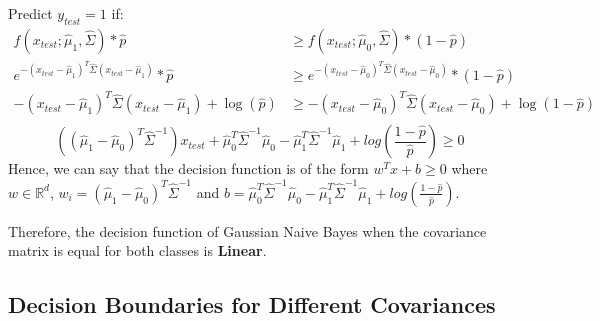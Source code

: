 \documentclass[
]{article}
\begin{document}
Predict \(y_{test}=1\) if: \begin{align*}
f(x_{test};\hat{\mu}_1, \hat{\Sigma})*\hat{p}&\ge f(x_{test};\hat{\mu}_0, \hat{\Sigma})*(1-\hat{p}) \\
e^{-(x_{test}-\hat{\mu}_1)^T\hat{\Sigma}(x_{test}-\hat{\mu}_1)}*\hat{p}&\ge e^{-(x_{test}-\hat{\mu}_0)^T\hat{\Sigma}(x_{test}-\hat{\mu}_0)}*(1-\hat{p}) \\
-(x_{test}-\hat{\mu}_1)^T\hat{\Sigma}(x_{test}-\hat{\mu}_1)+\log(\hat{p})&\ge -(x_{test}-\hat{\mu}_0)^T\hat{\Sigma}(x_{test}-\hat{\mu}_0) + \log(1-\hat{p}) \\
\end{align*} \[
\left( (\hat{\mu}_1-\hat{\mu}_0)^T\hat{\Sigma}^{-1} \right)x_{test} + \hat{\mu}_0^T\hat{\Sigma}^{-1}\hat{\mu}_0 - \hat{\mu}_1^T\hat{\Sigma}^{-1}\hat{\mu}_1 + log(\frac{1-\hat{p}}{\hat{p}}) \ge 0
\] Hence, we can say that the decision function is of the form
\(w^Tx+b\ge0\) where \(w\in\mathbb{R}^d\),
\(w_i= (\hat{\mu}_1-\hat{\mu}_0)^T\hat{\Sigma}^{-1}\) and
\(b=\hat{\mu}_0^T\hat{\Sigma}^{-1}\hat{\mu}_0 - \hat{\mu}_1^T\hat{\Sigma}^{-1}\hat{\mu}_1 + log(\frac{1-\hat{p}}{\hat{p}})\).

Therefore, the decision function of Gaussian Naive Bayes when the
covariance matrix is equal for both classes is \textbf{Linear}.

\hypertarget{decision-boundaries-for-different-covariances}{%
\subsection{Decision Boundaries for Different
Covariances}\label{decision-boundaries-for-different-covariances}}
\end{document}
